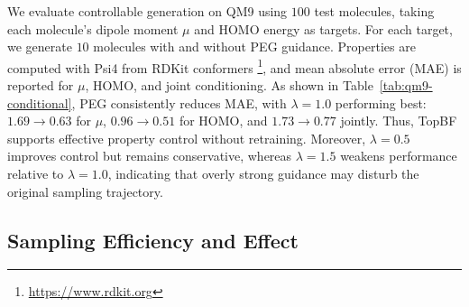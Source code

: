 \documentclass[journal,twoside,web]{ieeecolor}
\begin{document}

We evaluate controllable generation on QM9 using $100$ test molecules, taking each molecule's dipole moment $\mu$ and HOMO energy as targets. For each target, we generate $10$ molecules with and without PEG guidance. Properties are computed with Psi4 \cite{smith2020psi4} from RDKit conformers \footnote{\url{https://www.rdkit.org}}, and mean absolute error (MAE) is reported for $\mu$, HOMO, and joint conditioning. As shown in Table~\ref{tab:qm9-conditional}, PEG consistently reduces MAE, with $\lambda=1.0$ performing best: $1.69\!\to\!0.63$ for $\mu$, $0.96\!\to\!0.51$ for HOMO, and $1.73\!\to\!0.77$ jointly. Thus, TopBF supports effective property control without retraining. Moreover, $\lambda=0.5$ improves control but remains conservative, whereas $\lambda=1.5$ weakens performance relative to $\lambda=1.0$, indicating that overly strong guidance may disturb the original sampling trajectory.




\subsection{Sampling Efficiency and Effect}
\end{document}
